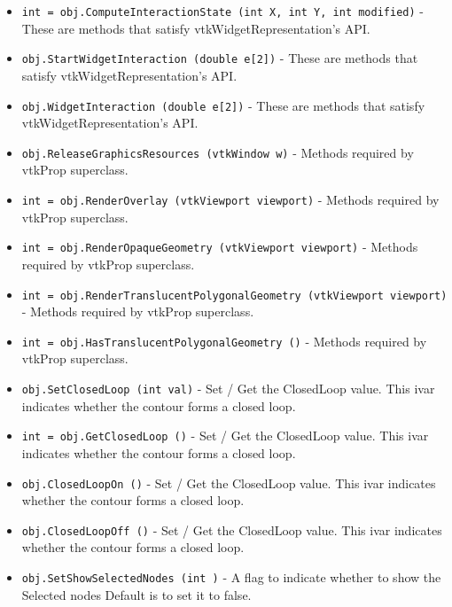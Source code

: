 \begin{itemize}
\item  \verb|int = obj.ComputeInteractionState (int X, int Y, int modified)| -  These are methods that satisfy vtkWidgetRepresentation's API.

\item  \verb|obj.StartWidgetInteraction (double e[2])| -  These are methods that satisfy vtkWidgetRepresentation's API.

\item  \verb|obj.WidgetInteraction (double e[2])| -  These are methods that satisfy vtkWidgetRepresentation's API.

\item  \verb|obj.ReleaseGraphicsResources (vtkWindow w)| -  Methods required by vtkProp superclass.

\item  \verb|int = obj.RenderOverlay (vtkViewport viewport)| -  Methods required by vtkProp superclass.

\item  \verb|int = obj.RenderOpaqueGeometry (vtkViewport viewport)| -  Methods required by vtkProp superclass.

\item  \verb|int = obj.RenderTranslucentPolygonalGeometry (vtkViewport viewport)| -  Methods required by vtkProp superclass.

\item  \verb|int = obj.HasTranslucentPolygonalGeometry ()| -  Methods required by vtkProp superclass.

\item  \verb|obj.SetClosedLoop (int val)| -  Set / Get the ClosedLoop value. This ivar indicates whether the contour
 forms a closed loop. 

\item  \verb|int = obj.GetClosedLoop ()| -  Set / Get the ClosedLoop value. This ivar indicates whether the contour
 forms a closed loop. 

\item  \verb|obj.ClosedLoopOn ()| -  Set / Get the ClosedLoop value. This ivar indicates whether the contour
 forms a closed loop. 

\item  \verb|obj.ClosedLoopOff ()| -  Set / Get the ClosedLoop value. This ivar indicates whether the contour
 forms a closed loop. 

\item  \verb|obj.SetShowSelectedNodes (int )| -  A flag to indicate whether to show the Selected nodes
 Default is to set it to false.


\end{itemize}
